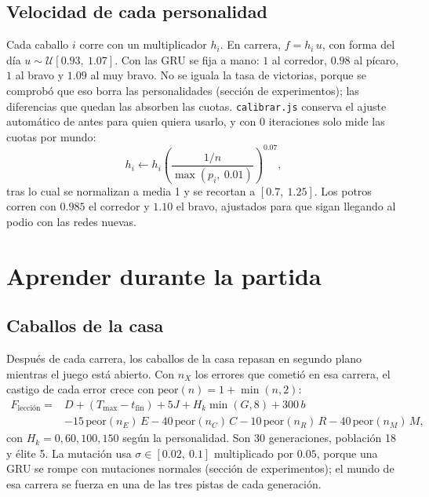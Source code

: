 \documentclass[11pt,letterpaper]{article}
\begin{document}
\subsection{Velocidad de cada personalidad}
Cada caballo $i$ corre con un multiplicador $h_i$. En carrera, $f = h_i\, u$, con forma del día $u \sim \mathcal{U}[0.93,\ 1.07]$. Con las GRU se fija a mano: $1$ al corredor, $0.98$ al pícaro, $1$ al bravo y $1.09$ al muy bravo. No se iguala la tasa de victorias, porque se comprobó que eso borra las personalidades (sección de experimentos); las diferencias que quedan las absorben las cuotas. \texttt{calibrar.js} conserva el ajuste automático de antes para quien quiera usarlo, y con 0 iteraciones solo mide las cuotas por mundo:
\begin{equation}
h_i \leftarrow h_i \left(\frac{1/n}{\max(p_i,\ 0.01)}\right)^{0.07},
\end{equation}
tras lo cual se normalizan a media 1 y se recortan a $[0.7,\ 1.25]$. Los potros corren con $0.985$ el corredor y $1.10$ el bravo, ajustados para que sigan llegando al podio con las redes nuevas.

\section{Aprender durante la partida}
\subsection{Caballos de la casa}
Después de cada carrera, los caballos de la casa repasan en segundo plano mientras el juego está abierto. Con $n_X$ los errores que cometió en esa carrera, el castigo de cada error crece con $\text{peor}(n) = 1 + \min(n, 2)$:
\begin{equation}
\begin{split}
F_{\text{lección}} = {} & D + (T_{\max} - t_{\text{fin}}) + 5J + H_k \min(G, 8) + 300\,b \\
& - 15\,\text{peor}(n_E)\,E - 40\,\text{peor}(n_C)\,C - 10\,\text{peor}(n_R)\,R - 40\,\text{peor}(n_M)\,M,
\end{split}
\end{equation}
con $H_k = 0, 60, 100, 150$ según la personalidad. Son 30 generaciones, población 18 y élite 5. La mutación usa $\sigma \in [0.02,\ 0.1]$ multiplicado por $0.05$, porque una GRU se rompe con mutaciones normales (sección de experimentos); el mundo de esa carrera se fuerza en una de las tres pistas de cada generación.
\end{document}
